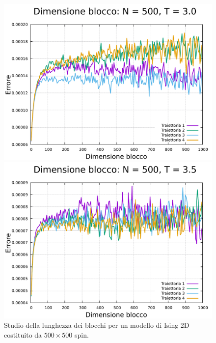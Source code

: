 \begin{figure}[htbp]
    \begin{minipage}{0.45\textwidth}  
      \centering
      \includegraphics[page=1, width=\textwidth]{Immagini/simIsing2D/metro/lblk/err_500_3.0.pdf}
      \caption{$T\,=\,3.0$}
    \end{minipage}\hfill
    \begin{minipage}{0.45\textwidth}  
      \centering
      \includegraphics[page=1, width=\textwidth]{Immagini/simIsing2D/metro/lblk/err_500_3.5.pdf}
      \caption{$T\,=\,3.5$}
    \end{minipage}
    \caption{Studio della lunghezza dei blocchi per un modello di Ising 2D costituito da $500 \times 500$ spin.}
\end{figure}

\vspace*{\fill}